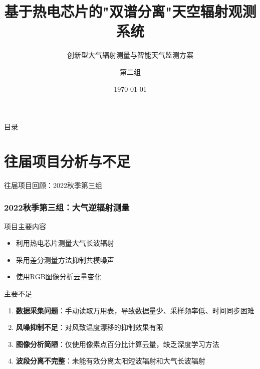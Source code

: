 \documentclass[aspectratio=169,11pt]{ctexbeamer}
\title{基于热电芯片的"双谱分离"天空辐射观测系统}
\subtitle{创新型大气辐射测量与智能天气监测方案}
\author{第二组}
\institute{芯片发电技术基础与应用}
\date{\today}
\begin{document}
\begin{frame}
  \titlepage
\end{frame}

\begin{frame}{目录}
\tableofcontents
\end{frame}

\section{往届项目分析与不足}

\begin{frame}{往届项目回顾：2022秋季第三组}
\frametitle{2022秋季第三组：大气逆辐射测量}
\begin{block}{项目主要内容}
\begin{itemize}
    \item 利用热电芯片测量大气长波辐射
    \item 采用差分测量方法抑制共模噪声
    \item 使用RGB图像分析云量变化
\end{itemize}
\end{block}

\begin{alertblock}{主要不足}
\begin{enumerate}
    \item \textbf{数据采集问题}：手动读取万用表，导致数据量少、采样频率低、时间同步困难
    \item \textbf{风噪抑制不足}：对风致温度漂移的抑制效果有限
    \item \textbf{图像分析简陋}：仅使用像素点百分比计算云量，缺乏深度学习方法
    \item \textbf{波段分离不完整}：未能有效分离太阳短波辐射和大气长波辐射
\end{enumerate}
\end{alertblock}
\end{frame}
\end{document}
